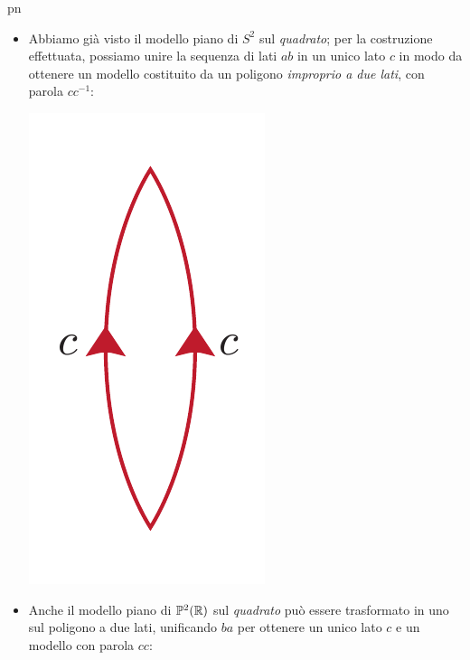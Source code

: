 \begin{example}{pn}~{}
	\begin{itemize}
		\item Abbiamo già visto il modello piano di $S^2$ sul \textit{quadrato}; per la costruzione effettuata, possiamo unire la sequenza di lati $ab$ in un unico lato $c$ in modo da ottenere un modello costituito da un poligono \textit{improprio a due lati}, con parola $cc^{-1}$:
		\begin{center}
			\includegraphics[trim=0cm 0cm 0cm 0cm, clip, scale=0.375]{images/sphere2lines.pdf}
		\end{center}
		\item Anche il modello piano di $\mathbb{P}^2(\mathbb{R})$ sul \textit{quadrato} può essere trasformato in uno sul poligono a due lati, unificando $ba$ per ottenere un unico lato $c$ e un modello con parola $cc$:
		\begin{center}

\end{center}
\end{itemize}
\end{example}
